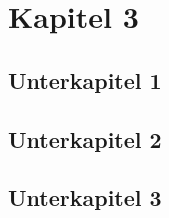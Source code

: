 \chapter{Kapitel 3}
\blindtext
\section{Unterkapitel 1}
\blindtext
\section{Unterkapitel 2}
\blindtext
\section{Unterkapitel 3}
\blindtext